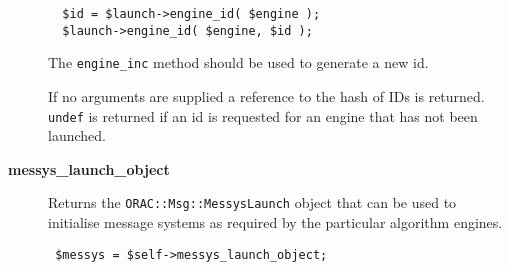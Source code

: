 \begin{description}
\begin{verbatim}
  $id = $launch->engine_id( $engine );
  $launch->engine_id( $engine, $id );
\end{verbatim}


The \texttt{engine\_inc} method should be used to generate a new id.



If no arguments are supplied a reference to the hash of IDs is
returned. \texttt{undef} is returned if an id is requested for an
engine that has not been launched.


\item[{\textbf{messys\_launch\_object}}] \mbox{}

Returns the \texttt{ORAC::Msg::MessysLaunch} object that can be used
to initialise message systems as required by the particular
algorithm engines.

\begin{verbatim}
 $messys = $self->messys_launch_object;
\end{verbatim}
\end{description}

